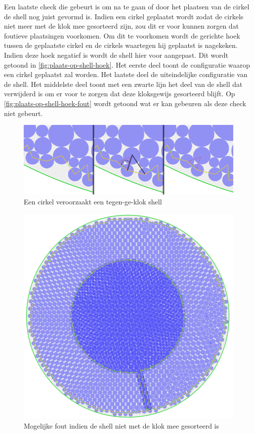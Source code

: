 \documentclass[12pt,a4paper,oneside]{book}
\begin{document}
Een laatste check die gebeurt is om na te gaan of door het plaatsen van de cirkel de shell nog juist gevormd is.
Indien een cirkel geplaatst wordt zodat de cirkels niet meer met de klok mee gesorteerd zijn, zou dit er voor kunnen zorgen dat foutieve plaatsingen voorkomen.
Om dit te voorkomen wordt de gerichte hoek tussen de geplaatste cirkel en de cirkels waartegen hij geplaatst is nagekeken.
Indien deze hoek negatief is wordt de shell hier voor aangepast.
Dit wordt getoond in \autoref{fig:plaats-op-shell-hoek}.
Het eerste deel toont de configuratie waarop een cirkel geplaatst zal worden.
Het laatste deel de uiteindelijke configuratie van de shell.
Het middelste deel toont met een zwarte lijn het deel van de shell dat verwijderd is om er voor te zorgen dat deze kloksgewijs gesorteerd blijft.
Op \autoref{fig:plaats-op-shell-hoek-fout}  wordt getoond wat er kan gebeuren als deze check niet gebeurt.

\begin{figure}
  \centering
  \includegraphics[width=1.0\textwidth]{plaats-op-shell-hoek.png}
  \caption{Een cirkel veroorzaakt een tegen-ge-klok shell} \label{fig:plaats-op-shell-hoek} 
\end{figure}

\begin{figure}
  \centering
  \includegraphics[width=.65\textwidth]{plaats-op-shell-hoek-fout.png}
  \caption{Mogelijke fout indien de shell niet met de klok mee gesorteerd is} \label{fig:plaats-op-shell-hoek-fout} 
\end{figure}
\end{document}
